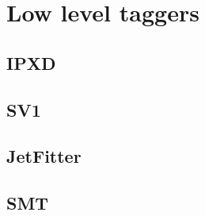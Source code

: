 \section{Low level taggers}

\subsection{IPXD}
\subsection{SV1}
\subsection{JetFitter}
\subsection{SMT}